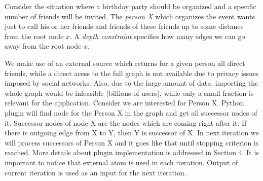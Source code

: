 \documentclass[14pt,a4paper, titlepage]{article}
\begin{document}
Consider the situation where a birthday party should be organized and a specific number of friends will
 be invited. The \emph{person X} which organizes the event wants just to call his or her friends and friends of these friends up to some distance from the root node $x$. A \emph{depth constraint} specifies how many edges we can go away from the root node $x$.
 
 We make use of an external source which returns for a given person all direct friends, while a direct acess to the full graph is not available due to privacy issues imposed by social networks. Also, due to the large amount of data, importing the whole graph would be infeasible (billions of users), while only a small fraction is relevant for the application. Consider we are interested for Person X. Python plugin will find node for the Person X in the graph and get all successor nodes of it. Successor nodes of node X are the nodes which are coming right after it. If there is outgoing edge from X to Y, then Y is successor of X. In next iteration we will process successors of Person X and it goes like that until stopping criterion is reached. More details about plugin implementation is addressed in Section 4. It is important to notice that external atom is used in each iteration. Output of current iteration is used as an input for the next iteration. 
               
\end{document}
